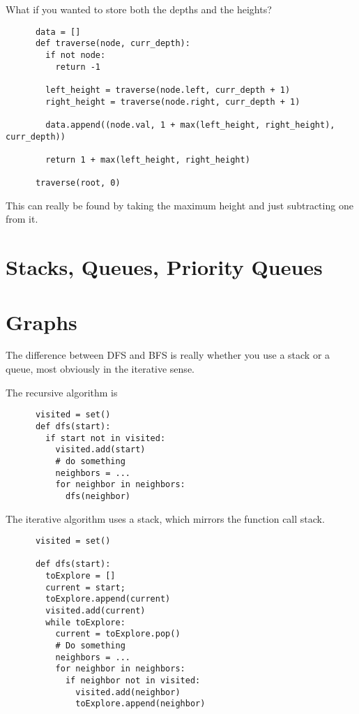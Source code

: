 \documentclass{article}
\begin{document}
  What if you wanted to store both the depths and the heights? 

  \begin{lstlisting}
      data = []
      def traverse(node, curr_depth): 
        if not node: 
          return -1

        left_height = traverse(node.left, curr_depth + 1)
        right_height = traverse(node.right, curr_depth + 1)

        data.append((node.val, 1 + max(left_height, right_height), curr_depth))

        return 1 + max(left_height, right_height)

      traverse(root, 0) 
  \end{lstlisting}

  \begin{example}
    This can really be found by taking the maximum height and just subtracting one from it. 
  \end{example}

\section{Stacks, Queues, Priority Queues}

  

\section{Graphs} 

  The difference between DFS and BFS is really whether you use a stack or a queue, most obviously in the iterative sense. 

  \begin{definition}[DFS]
    The recursive algorithm is 
    \begin{lstlisting}
      visited = set() 
      def dfs(start): 
        if start not in visited: 
          visited.add(start) 
          # do something 
          neighbors = ... 
          for neighbor in neighbors: 
            dfs(neighbor)
    \end{lstlisting}

    The iterative algorithm uses a stack, which mirrors the function call stack. 
    \begin{lstlisting}
      visited = set() 

      def dfs(start): 
        toExplore = [] 
        current = start; 
        toExplore.append(current) 
        visited.add(current) 
        while toExplore: 
          current = toExplore.pop() 
          # Do something
          neighbors = ... 
          for neighbor in neighbors: 
            if neighbor not in visited: 
              visited.add(neighbor) 
              toExplore.append(neighbor)

    \end{lstlisting}
  \end{definition}
\end{document}

